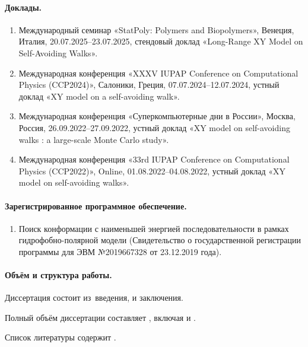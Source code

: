 \paragraph*{Доклады.}

\begin{enumerate} 


\item Международный семинар «StatPoly: Polymers and Biopolymers», Венеция, Италия, 20.07.2025--23.07.2025,  стендовый доклад «Long-Range XY Model on Self-Avoiding Walks». 


\item  Международная конференция «XXXV IUPAP Conference on Computational Physics (CCP2024)», Салоники, Греция, 07.07.2024--12.07.2024, устный доклад «XY model on a self-avoiding walk».

\item Международная конференция «Суперкомпьютерные дни в России», Москва, Россия, 26.09.2022--27.09.2022, устный доклад «XY model on self-avoiding walks : a large-scale Monte Carlo study».

\item Международная конференция «33rd IUPAP Conference on Computational Physics (CCP2022)», Online, 01.08.2022--04.08.2022, устный доклад «XY model on self-avoiding walks».


\end{enumerate} 



\paragraph*{Зарегистрированное программное обеспечение.}


\begin{enumerate} 

\item Поиск конформации с наименьшей энергией последовательности в рамках гидрофобно-полярной модели  (Свидетельство о государственной регистрации программы для ЭВМ №2019667328 от 23.12.2019 года).

\end{enumerate} 




% 
%	
\paragraph*{Объём и структура работы.}
Диссертация состоит из~введения,
 и
заключения.  

Полный объём диссертации составляет
, включая
 и
.

Список литературы содержит
.




 